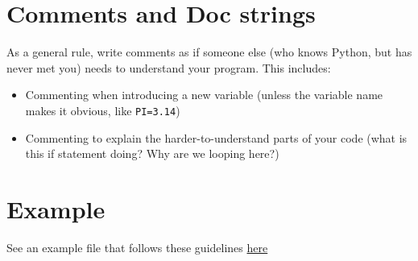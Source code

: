 \documentclass{article}
\begin{document}
\section*{Comments and Doc strings}
As a general rule, write comments as if someone else (who knows Python, but has never met you) needs to understand your program.
This includes:
\begin{itemize}
	\item Commenting when introducing a new variable (unless the variable name makes it obvious, like \texttt{PI=3.14})
	\item Commenting to explain the harder-to-understand parts of your code (what is this if statement doing? Why are we looping here?)
\end{itemize}
\section*{Example}
See an example file that follows these guidelines \href{https://drive.google.com/file/d/1GPYnWsq01MTotlsTjylKzifQ6dDCEbD2/view?usp=sharing}{here}
\end{document}
